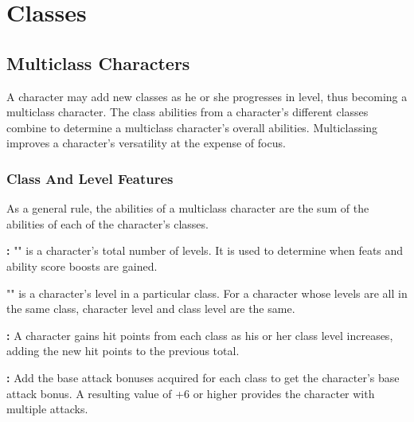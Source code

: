 \chapter{Classes}\label{chapter:Classes}













\section{Multiclass Characters}

A character may add new classes as he or she progresses in level, thus becoming 
a multiclass character. The class abilities from a character's different classes 
combine to determine a multiclass character's overall abilities. Multiclassing 
improves a character's versatility at the expense of focus.

\subsection{Class And Level Features}

As a general rule, the abilities of a multiclass character are the sum of the abilities 
of each of the character's classes.

\textbf{:} "" is a character's total number of levels. It 
is used to determine when feats and ability score boosts are gained.

"" is a character's level in a particular class. For a character whose 
levels are all in the same class, character level and class level are the same.

\textbf{:} A character gains hit points from each class as his or her 
class level increases, adding the new hit points to the previous total. 

\textbf{:} Add the base attack bonuses acquired for each class 
to get the character's base attack bonus. A resulting value of +6 or higher provides 
the character with multiple attacks. 

